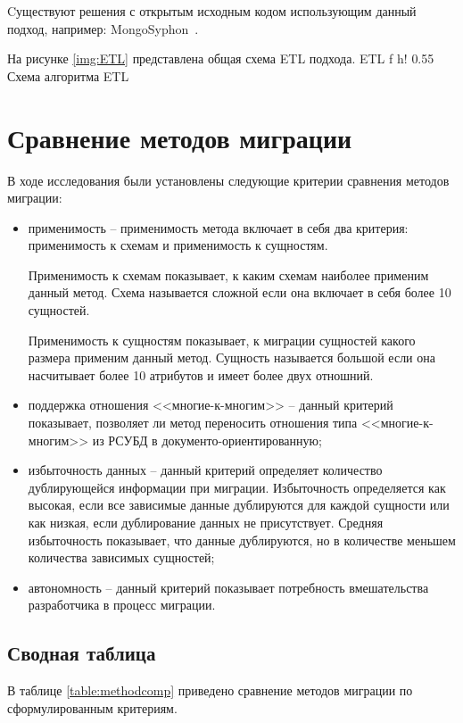 Cуществуют решения с открытым исходным кодом использующим данный подход, например: MongoSyphon~\cite{mongosyphon}.

На рисунке \ref{img:ETL} представлена общая схема ETL подхода.
    {ETL} %
    {f} %
    {h!} %
    {0.55\textwidth} %
    {Схема алгоритма ETL} %

\clearpage

\section{Сравнение методов миграции}
В ходе исследования были установлены следующие критерии сравнения методов миграции:
\begin{itemize}[label=---]
    \item применимость -- применимость метода включает в себя два критерия: применимость к схемам и применимость к сущностям.
    
    Применимость к схемам показывает, к каким схемам наиболее применим данный метод.
    Схема называется сложной если она включает в себя более 10 сущностей.

    Применимость к сущностям показывает, к миграции сущностей какого размера применим данный метод.
    Сущность называется большой если она насчитывает более 10 атрибутов и имеет более двух отношний.
    \item поддержка отношения <<многие-к-многим>> -- данный критерий показывает,
    позволяет ли метод переносить отношения типа <<многие-к-многим>> из РСУБД в документо-ориентированную;
    \item избыточность данных -- данный критерий определяет количество дублирующейся информации при миграции.
    Избыточность определяется как высокая, если все зависимые данные дублируются для каждой сущности или как низкая, если дублирование данных не присутствует.
    Средняя избыточность показывает, что данные дублируются, но в количестве меньшем количества зависимых сущностей;
    \item автономность -- данный критерий показывает потребность вмешательства разработчика в процесс миграции.
\end{itemize}

\clearpage

\subsection{Сводная таблица}
В таблице \ref{table:methodcomp} приведено сравнение методов миграции по сформулированным критериям.

